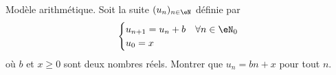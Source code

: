 


\begin{exercice}\label{exoTD3-0004}

	Modèle arithmétique. Soit la suite $(u_n)_{n\in\eN}$ définie par
	\begin{equation}
		\begin{cases}
			u_{n+1}=u_n+b	&	\forall n\in\eN_0\\
			u_0=x
		\end{cases}
	\end{equation}
	où $b$ et $x\geq 0$ sont deux nombres réels. Montrer que $u_n=bn+x$ pour tout $n$.

\end{exercice}
